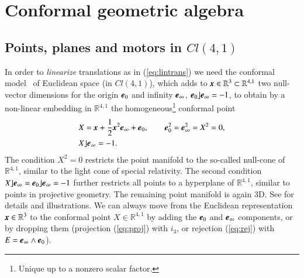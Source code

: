 \documentclass[cameraready]{jcmsi}%
\newcommand{\R}{\mathbb{R}}
\newcommand{\gvec}[1]{\ensuremath{\mbox{\textbf{\textit{#1}}}}}
\begin{document}
\section{Conformal geometric algebra \label{sc:CGA}}

\subsection{Points, planes and motors in $Cl(4,1)$}

In order to \textit{linearize} translations as in (\ref{eq:lintrans}) we need the conformal
model~\cite{SL:Diss, LVA:MoebRn, HL:IAandGR} of Euclidean space (in $Cl(4,1)$), 
which adds to $\gvec{x}\in\R^3\subset\R^{4,1}$ two null-vector dimensions for 
the origin $\gvec{e}_0$ and infinity $\gvec{e}_{\infty}$, 
$\gvec{e}_0\rfloor \gvec{e}_{\infty}=-1$, to obtain by a non-linear embedding in $\R^{4,1}$ the homogeneous\footnote{Unique up to a nonzero scalar factor.} conformal point
\begin{align}
  &X = \gvec{x} + \frac{1}{2}\gvec{x}^2\gvec{e}_{\infty}+\gvec{e}_0, 
  \qquad
  \gvec{e}_0^2=\gvec{e}_{\infty}^2=X^2=0,
  \nonumber \\
  &X\rfloor \gvec{e}_{\infty}=-1.
\end{align}
The condition $X^2=0$ restricts the point manifold to the so-called null-cone of $\R^{4,1}$, similar to the light cone of special relativity. The second condition $X\rfloor \gvec{e}_{\infty}=\gvec{e}_0\rfloor\gvec{e}_{\infty}=-1$ further restricts all points to a hyperplane of $\R^{4,1}$, similar to points in projective geometry. The remaining point manifold is again 3D. See \cite{DL:GAfPh,DFM:GAfCS,HTBY:Carrier,HL:IAandGR,AM:LinGA,CP:CLUCalc,CP:GAappEng,GS:CMinGA} for details and illustrations. We can always move from the Euclidean representation $\gvec{x} \in \R^3$ to the conformal point $X \in \R^{4,1}$ by adding the $\gvec{e}_{0}$ and $\gvec{e}_{\infty}$ components, or by dropping them (projection (\ref{eq:proj}) with $i_3$, or rejection (\ref{eq:rej}) with $E=\gvec{e}_{\infty}\wedge\gvec{e}_{0}$). 
\end{document}
